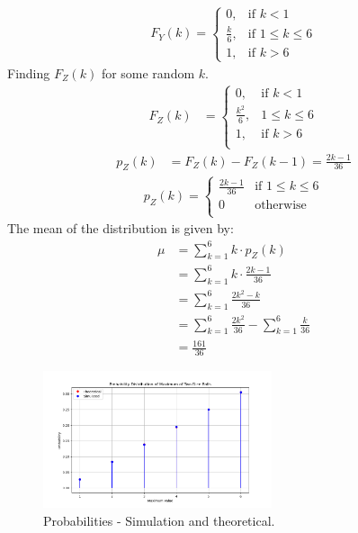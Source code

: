 \documentclass[journal,12pt,twocolumn]{IEEEtran}
\begin{document}
\begin{align}
F_Y(k) = \begin{cases}
  0, & \text{if } k < 1 \\
  \frac{k}{6}, & \text{if } 1 \leq k \leq 6 \\
  1, & \text{if } k > 6
\end{cases}
\end{align}
Finding $F_Z(k)$ for some random $k$.
\begin{align}
F_Z(k) &=
    \begin{cases}
     0, & \text{if } k < 1 \\
    \frac{k^2}{6}, & 1 \leq k \leq 6\\
     1, & \text{if } k > 6 \\
    \end{cases}
\end{align}
\begin{align}
p_Z(k) &= F_Z(k) - F_Z(k-1) = \frac{2k-1}{36} 
\end{align}
\begin{align}
p_Z(k) = \begin{cases} 
       \frac{2k-1}{36} & \text{if } 1 \leq k \leq 6 \\
        0 & \text{otherwise} \\
         \end{cases}
\end{align}
The mean of the distribution is given by:
\begin{align}
\mu &= \sum_{k=1}^{6} k \cdot p_Z(k) \\
&= \sum_{k=1}^{6} k \cdot \frac{2k-1}{36} \\
&= \sum_{k=1}^{6} \frac{2k^2-k}{36} \\
&= \sum_{k=1}^{6} \frac{2k^2}{36} - \sum_{k=1}^{6} \frac{k}{36} \\ 
&= \frac{161}{36}
\end{align}
\begin{figure}[ht]
\centering
\includegraphics[width=0.6\textwidth]{figs/Figure.png}
\caption{Probabilities - Simulation and theoretical.}
\label{fig:exemplar.12.13.3.35}
\end{figure}
\end{document}
